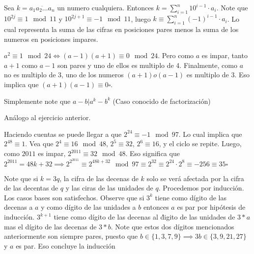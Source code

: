 \begin{sol}
	Sea $k = \overline{a_{1}a_{2}\dots a_{n}}$ un numero cualquiera. Entonces $k = \sum_{i = 1}^{n} 10^{i-1} \cdot a_{i}$. Note que $10^{2j} \equiv 1 \mod 11 $ y $10^{2j+1} \equiv -1 \mod 11$, luego $k \equiv \sum_{i=1}^{n}(-1)^{i-1} \cdot a_{i}$. Lo cual representa la suma de las cifras en posiciones pares menos la suma de los numeros en posiciones impares.
\end{sol}


\begin{sol}
	$a^2 \equiv 1 \mod 24 \iff (a-1)(a+1) \equiv 0 \mod 24$. Pero como $a$ es impar, tanto $a+1$ como $a-1$ son pares y uno de ellos es multiplo de 4. Finalmente, como $a$ no es multiplo de 3, uno de los numeros $(a+1) o (a-1)$ es multiplo de 3. Eso implica que $(a+1)(a-1) \equiv 0 \square$.
\end{sol}

\begin{sol}
	Simplemente note que $a-b |a^{k}-b^{k}$ (Caso conocido de factorizaci\'on)
\end{sol}

\begin{sol}
	An\'alogo al ejercicio anterior.
\end{sol}

\begin{sol}
	Haciendo cuentas se puede llegar a que $2^{24} \equiv -1 \mod 97$. Lo cual implica que $2^{48} \equiv 1$. Vea que $2^4 \equiv 16 \mod 48$, $2^5 \equiv 32$, $2^6 \equiv 16$, y el ciclo se repite. Luego, como $2011$ es impar, $2^{2011} \equiv 32 \mod 48$. Eso significa que $2^{2011} = 48k +32 \implies 2^{2^{2011}} \equiv 2^{48k+32} \mod 97 \equiv 2^{32} \equiv 2^{24} \cdot 2^8 \equiv -256 \equiv 35 \square$
\end{sol}

\begin{sol}
	Note que si $k = 3q$, la cifra de las decenas de $k$ solo se ver\'a afectada por la cifra de las decentas de $q$ y las ciras de las unidades de $q$. Procedemos por inducci\'on. Los casos bases son satisfechos. Observe que si $3^k$ tiene como d\'igito de las decenas a $a$ y como d\'igito de las unidades a $b$ entonces $a$ es par por hip\'otesis de inducci\'on. $3^{k+1} $ tiene como d\'igito de las decenas al \'digito de las unidades de $3*a$ mas el d\'igito de las decenas de $3*b$. Note que estos dos d\'igitos mencionados anteriormente son siempre pares, puesto que $b\in \{1, 3, 7, 9\} \implies 3b \in \{3, 9, 21, 27\}$ y $a$ es par. Eso concluye la inducci\'on
\end{sol}


